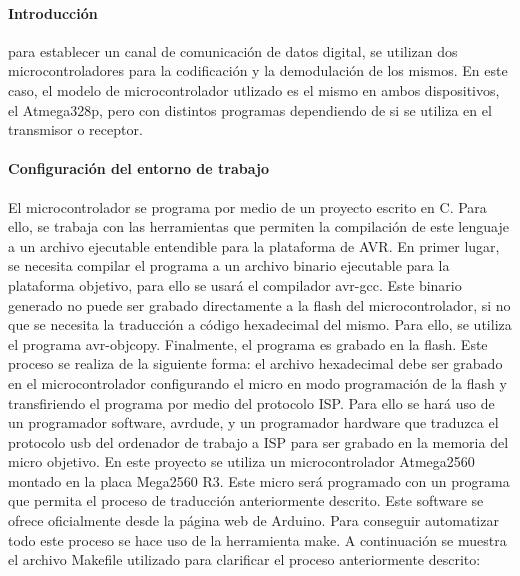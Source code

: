 \paragraph{Introducci\'on}
para establecer un canal de comunicación de datos digital, se utilizan dos microcontroladores para la codificación y la demodulación de los mismos. En este caso, el modelo de microcontrolador utlizado es el mismo en ambos dispositivos, el Atmega328p, pero con distintos programas dependiendo de si se utiliza en el transmisor o receptor.

\paragraph{Configuraci\'on del entorno de trabajo}
El microcontrolador se programa por medio de un proyecto escrito en C. Para ello, se trabaja con las herramientas que permiten la compilación de este lenguaje a un archivo ejecutable entendible para la plataforma de AVR.
En primer lugar, se necesita compilar el programa a un archivo binario ejecutable para la plataforma objetivo, para ello se usar\'a el compilador avr-gcc. Este binario generado no puede ser grabado directamente a la flash del microcontrolador, si no que se necesita la traducción a código hexadecimal del mismo. Para ello, se utiliza el programa avr-objcopy. 
Finalmente, el programa es grabado en la flash. Este proceso se realiza de la siguiente forma: el archivo hexadecimal debe ser grabado en el microcontrolador configurando el micro en modo programaci\'on de la flash y transfiriendo el programa por medio del protocolo ISP. Para ello se har\'a uso de un programador software, avrdude, y un programador hardware que traduzca el protocolo usb del ordenador de trabajo a ISP para ser grabado en la memoria del micro objetivo. En este proyecto se utiliza un microcontrolador Atmega2560 montado en la placa Mega2560 R3. Este micro será programado con un programa que permita el proceso de traducción anteriormente descrito. Este software se ofrece oficialmente desde la p\'agina web de Arduino.
Para conseguir automatizar todo este proceso se hace uso de la herramienta make. A continuaci\'on se muestra el archivo Makefile utilizado para clarificar el proceso anteriormente descrito:




